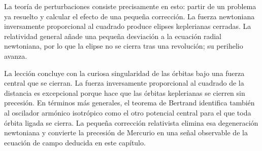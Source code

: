 La teoría de perturbaciones consiste precisamente en esto: partir de un problema ya resuelto y calcular el efecto de una pequeña corrección. La fuerza newtoniana inversamente proporcional al cuadrado produce elipses keplerianas cerradas. La relatividad general añade una pequeña desviación a la ecuación radial newtoniana, por lo que la elipse no se cierra tras una revolución; su perihelio avanza.

La lección concluye con la curiosa singularidad de las órbitas bajo una fuerza central que se cierran. La fuerza inversamente proporcional al cuadrado de la distancia es excepcional porque hace que las órbitas keplerianas se cierren sin precesión. En términos más generales, el teorema de Bertrand identifica también al oscilador armónico isotrópico como el otro potencial central para el que toda órbita ligada se cierra. La pequeña corrección relativista elimina esa degeneración newtoniana y convierte la precesión de Mercurio en una señal observable de la ecuación de campo deducida en este capítulo.